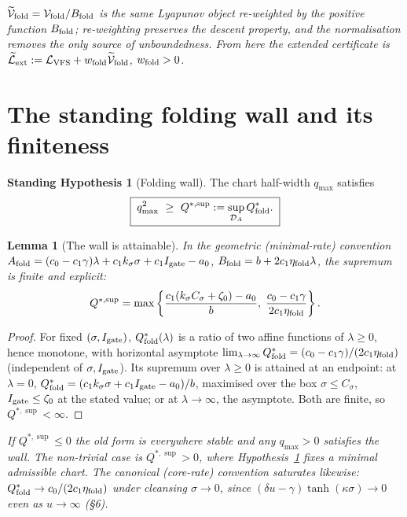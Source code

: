 \documentclass[11pt,a4paper,oneside]{book}
\newcommand{\Igate}{I_{\rm gate}}
\newcommand{\note}[1]{\textcolor{black!65}{\emph{#1}}}
\newcommand{\LV}{\mathcal L_{\rm VFS}}
\newcommand{\DA}{\mathcal D_A}
\newcommand{\Qs}{Q_{\rm fold}^{*}}
\newcommand{\Af}{A_{\rm fold}}
\newcommand{\Bf}{B_{\rm fold}}
\newcommand{\Vf}{\mathcal V_{\rm fold}}
\newcommand{\Vt}{\widetilde{\mathcal V}_{\rm fold}}
\newcommand{\Lt}{\widetilde{\mathcal L}_{\rm ext}}
\newcommand{\etaf}{\eta_{\rm fold}}
\theoremstyle{plain}
\newtheorem{lemma}{Lemma}[chapter]
\theoremstyle{definition}
\newtheorem{assumption}{Standing Hypothesis}[chapter]
\theoremstyle{remark}
\begin{document}
\note{$\Vt=\Vf/\Bf$ is the same Lyapunov object re-weighted by the positive function $\Bf$; re-weighting
preserves the descent property, and the normalisation removes the only source of unboundedness. From here
the extended certificate is $\Lt:=\LV+w_{\rm fold}\Vt$, $w_{\rm fold}>0$.}

\section{The standing folding wall and its finiteness}

\begin{assumption}[Folding wall]\label{foldinglyapunovaddendum:H:wall}
The chart half-width $q_{\max}$ satisfies
\begin{equation}
\boxed{\;q_{\max}^{2}\ \ge\ Q^{*,\sup}:=\sup_{\DA}\Qs.\;}
\end{equation}
\end{assumption}

\begin{lemma}[The wall is attainable]\label{foldinglyapunovaddendum:lem:finite}
In the geometric (minimal-rate) convention
$\Af=(c_0-c_1\gamma)\lambda+c_1k_\sigma\sigma+c_1\Igate-a_0$, $\Bf=b+2c_1\etaf\lambda$, the supremum is
finite and explicit:
\begin{equation}
Q^{*,\sup}=\max\left\{\frac{c_1\!\left(k_\sigma C_\sigma+\zeta_0\right)-a_0}{b},\;
\frac{c_0-c_1\gamma}{2c_1\etaf}\right\}.
\end{equation}
\end{lemma}
\begin{proof}
For fixed $(\sigma,\Igate)$, $\Qs(\lambda)$ is a ratio of two affine functions of $\lambda\ge0$, hence
monotone, with horizontal asymptote $\lim_{\lambda\to\infty}\Qs=(c_0-c_1\gamma)/(2c_1\etaf)$ (independent
of $\sigma,\Igate$). Its supremum over $\lambda\ge0$ is attained at an endpoint: at $\lambda=0$,
$\Qs=(c_1k_\sigma\sigma+c_1\Igate-a_0)/b$, maximised over the box $\sigma\le C_\sigma$,
$\Igate\le\zeta_0$ at the stated value; or at $\lambda\to\infty$, the asymptote. Both are finite, so
$Q^{*,\sup}<\infty$.
\end{proof}

\note{If $Q^{*,\sup}\le0$ the old form is everywhere stable and any $q_{\max}>0$ satisfies the wall. The
non-trivial case is $Q^{*,\sup}>0$, where Hypothesis~\ref{foldinglyapunovaddendum:H:wall} fixes a minimal admissible chart. The
canonical (core-rate) convention saturates likewise: $\Qs\to c_0/(2c_1\etaf)$ under cleansing
$\sigma\to0$, since $(\delta u-\gamma)\tanh(\kappa\sigma)\to0$ even as $u\to\infty$ (\S6).}
\end{document}
